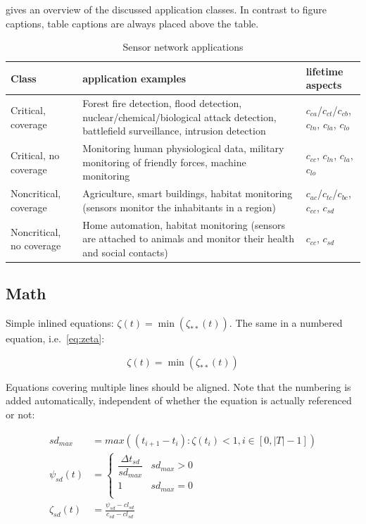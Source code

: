  gives an overview of the discussed application classes.
In contrast to figure captions, table captions are always placed above the table.

\begin{table}
	\centering
	\caption{Sensor network applications}
	\label{tab:SensorNetworkApplications}
	\begin{tabular}{>{\raggedright}p{1.8cm}p{5.4cm}p{3.4cm}}
		\toprule
		Class & application examples & lifetime aspects \\
		\midrule
		Critical, coverage & 
				Forest fire detection, flood detection, nuclear/chemical/biological attack detection, battlefield surveillance, intrusion detection & 
				$c_{ca}$/$c_{ct}$/$c_{cb}$, $c_{ln}$, $c_{la}$, $c_{lo}$\\
		Critical, no coverage & 
				Monitoring human physiological data, military monitoring of friendly forces, machine monitoring & 
				$c_{cc}$, $c_{ln}$, $c_{la}$, $c_{lo}$ \\
		Noncritical, coverage & 
				Agriculture, smart buildings, habitat monitoring (sensors monitor the inhabitants in a region) & 
				$c_{ac}$/$c_{tc}$/$c_{bc}$, $c_{cc}$, $c_{sd}$ \\
		Noncritical, no coverage & 
				Home automation, habitat monitoring (sensors are attached to animals and monitor their health and social contacts) & 
				$c_{cc}$, $c_{sd}$ 	\\
		\bottomrule
	\end{tabular}
\end{table}


\subsection{Math}

Simple inlined equations: $\zeta(t) = \min( \zeta_{**}(t))$.
The same in a numbered equation, i.e.\ \cref{eq:zeta}:

\begin{equation}
\zeta(t) = \min( \zeta_{**}(t))
\label{eq:zeta}
\end{equation}

Equations covering multiple lines should be aligned. Note that the numbering is added automatically, independent of whether the equation is actually referenced or not:

\begin{align}
sd_{max} &= max((t_{i+1} - t_i) : \zeta(t_i) < 1, i \in [0, |T|-1]) \\
\psi_{sd}(t) &= \left\{ \begin{array}{cl}
\dfrac{\Delta t_{sd}}{sd_{max}} & sd_{max} > 0 \\
1 & sd_{max} = 0 \\
\end{array} \right.\\
\zeta_{sd}(t) &= \frac{\psi_{sd} - cl_{sd}}{c_{sd} - cl_{sd}}
\end{align}


